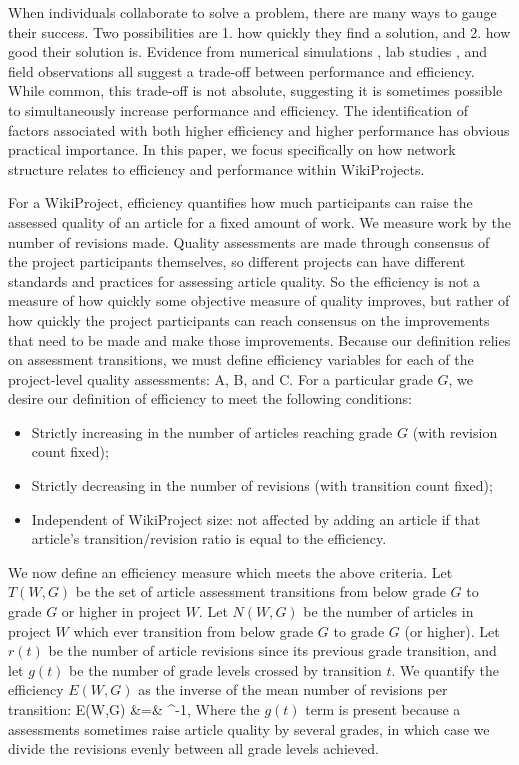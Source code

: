 When individuals collaborate to solve a problem,
there are many ways to gauge their success.
Two possibilities are
1. how quickly they find a solution, and
2. how good their solution is.
Evidence from numerical simulations
\cite{lazer_network_2007,mason_propagation_2008,mason_collaborative_2012,grim_scientific_2013,barkoczi_social_2016},
lab studies \cite{kearns_experiments_2012},
and field observations \cite{gentry_consensus_1982}
all suggest a trade-off between performance and efficiency.
While common, this trade-off is not absolute,
suggesting it is sometimes possible to simultaneously increase
performance and efficiency.
The identification of factors associated with both higher efficiency
and higher performance has obvious practical importance.
In this paper, we focus specifically on how network structure
relates to efficiency and performance within WikiProjects.

For a WikiProject, efficiency quantifies how much participants can raise the
assessed quality of an article for a fixed amount of work.
We measure work by the number of revisions made.
Quality assessments are made through consensus of the project participants themselves,
so different projects can have different standards and practices for assessing article quality.
So the efficiency is not a measure of how quickly some objective measure of quality improves,
but rather of how quickly the project participants can reach consensus on the improvements that
need to be made and make those improvements.
Because our definition relies on assessment transitions,
we must define efficiency variables for
each of the project-level quality assessments: A, B, and C.
For a particular grade $G$,
we desire our definition of efficiency to meet the following conditions:
\begin{itemize}
\item{Strictly increasing in the number of articles reaching grade $G$ (with revision count fixed);}
\item{Strictly decreasing in the number of revisions (with transition count fixed);}
\item{Independent of WikiProject size: not affected by adding an article if that article's transition/revision ratio is equal to the efficiency.}
\end{itemize}

We now define an efficiency measure which meets the above criteria.
Let $T(W,G)$ be the set of article assessment transitions from below grade $G$
to grade $G$ or higher in project $W$.
Let $N(W,G)$ be the number of articles in project $W$ which ever transition
from below grade $G$ to grade $G$ (or higher).
Let $r(t)$ be the number of article revisions since its previous grade transition,
and let $g(t)$ be the number of grade levels crossed by transition $t$.
We quantify the efficiency $E(W,G)$ as the inverse of the mean number of revisions
per transition:
\beq
E(W,G)
&=&
^{-1},
\eeq
Where the $g(t)$ term is present because a assessments sometimes raise article quality by several
grades, in which case we divide the revisions evenly between all grade levels achieved.

